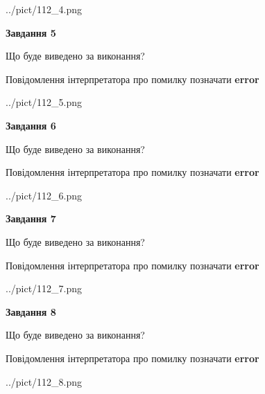 \documentclass[12pt, ukrainian]{article}
\begin{document}
{\begin{center}
	{../pict/112_4.png}
\end{center}
\newpage

{\begin {center}\textbf{Завдання 5}\end {center}}\par
Що буде виведено за виконання? \par
Повідомлення інтерпретатора про помилку позначати \textbf{error}

\begin{center}
	{../pict/112_5.png}
\end{center}
\newpage

{\begin {center}\textbf{Завдання 6}\end {center}}\par
Що буде виведено за виконання? \par
Повідомлення інтерпретатора про помилку позначати \textbf{error}

\begin{center}
	{../pict/112_6.png}
\end{center}
\newpage

{\begin {center}\textbf{Завдання 7}\end {center}}\par
Що буде виведено за виконання? \par
Повідомлення інтерпретатора про помилку позначати \textbf{error}

\begin{center}
	{../pict/112_7.png}
\end{center}
\newpage

{\begin {center}\textbf{Завдання 8}\end {center}}\par
Що буде виведено за виконання? \par
Повідомлення інтерпретатора про помилку позначати \textbf{error}

\begin{center}
	{../pict/112_8.png}
\end{center}
\newpage

}
\end{document}
